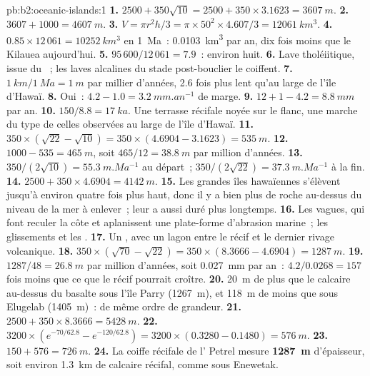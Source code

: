 \begin{solution}{pb:b2:oceanic-islands:1}
\textbf{1.} $2500 + 350\sqrt{10} = 2500 + 350\times3.1623 = \qty{3607}{m}$.
\textbf{2.} $3607 + 1000 = \qty{4607}{m}$.
\textbf{3.} $V = \pi r^2h/3 = \pi\times50^2\times4.607/3 = \qty{12061}{km^3}$.
\textbf{4.} $0.85\times12\,061 = \qty{10252}{km^3}$ en \qty{1}{Ma}~: \qty{0.0103}{km^3} par an,
dix fois moins que le Kilauea aujourd'hui.
\textbf{5.} $95\,600/12\,061 = 7.9$~: environ huit.
\textbf{6.} Lave tholéiitique, issue du ~; les laves alcalines du stade post-bouclier
le coiffent.
\textbf{7.} $\qty{1}{km}/\qty{1}{Ma} = \qty{1}{m}$ par millier d'années, 2.6 fois plus lent qu'au
large de l'île d'Hawaï.
\textbf{8.} Oui~: $4.2 - 1.0 = \qty{3.2}{mm.an^{-1}}$ de marge.
\textbf{9.} $12 + 1 - 4.2 = \qty{8.8}{mm}$ par an.
\textbf{10.} $150/8.8 = \qty{17}{ka}$. Une terrasse récifale noyée sur le flanc, une marche du type
de celles observées au large de l'île d'Hawaï.
\textbf{11.} $350\times(\sqrt{22} - \sqrt{10}) = 350\times(4.6904 - 3.1623) = \qty{535}{m}$.
\textbf{12.} $1000 - 535 = \qty{465}{m}$, soit $465/12 = \qty{38.8}{m}$ par million d'années.
\textbf{13.} $350/(2\sqrt{10}) = \qty{55.3}{m.Ma^{-1}}$ au départ~; $350/(2\sqrt{22}) =
\qty{37.3}{m.Ma^{-1}}$ à la fin.
\textbf{14.} $2500 + 350\times4.6904 = \qty{4142}{m}$.
\textbf{15.} Les grandes îles hawaïennes s'élèvent jusqu'à environ quatre fois plus haut, donc il y a bien plus de
roche au-dessus du niveau de la mer à enlever~; leur  a aussi duré plus longtemps.
\textbf{16.} Les vagues, qui font reculer la côte et aplanissent une plate-forme d'abrasion marine~; les
glissements et les .
\textbf{17.} Un , avec un lagon entre le récif et le dernier rivage volcanique.
\textbf{18.} $350\times(\sqrt{70} - \sqrt{22}) = 350\times(8.3666 - 4.6904) = \qty{1287}{m}$.
\textbf{19.} $1287/48 = \qty{26.8}{m}$ par million d'années, soit \qty{0.027}{mm} par an~: $4.2/0.0268 =
157$ fois moins que ce que le récif pourrait croître.
\textbf{20.} \qty{20}{m} de plus que le calcaire au-dessus du basalte sous l'île Parry
(\qty{1267}{m}), et \qty{118}{m} de moins que sous Elugelab (\qty{1405}{m})~: de même ordre de grandeur.
\textbf{21.} $2500 + 350\times8.3666 = \qty{5428}{m}$.
\textbf{22.} $3200\times(e^{-70/62.8} - e^{-120/62.8}) = 3200\times(0.3280 - 0.1480) =
\qty{576}{m}$.
\textbf{23.} $150 + 576 = \qty{726}{m}$.
\textbf{24.} La coiffe récifale de l' Petrel mesure \textbf{\qty{1287}{m}} d'épaisseur, soit environ \qty{1.3}{km}
de calcaire récifal, comme sous Enewetak.
\end{solution}

